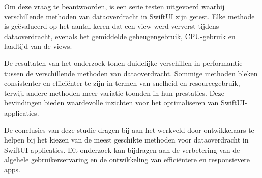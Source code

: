 Om deze vraag te beantwoorden, is een serie testen uitgevoerd waarbij verschillende methoden van dataoverdracht in SwiftUI zijn getest. Elke methode is geëvalueerd op het aantal keren dat een view werd ververst tijdens dataoverdracht, evenals het gemiddelde geheugengebruik, CPU-gebruik en laadtijd van de views.

De resultaten van het onderzoek tonen duidelijke verschillen in performantie tussen de verschillende methoden van dataoverdracht. Sommige methoden bleken consistenter en efficiënter te zijn in termen van snelheid en resourcegebruik, terwijl andere methoden meer variatie toonden in hun prestaties. Deze bevindingen bieden waardevolle inzichten voor het optimaliseren van SwiftUI-applicaties.

De conclusies van deze studie dragen bij aan het werkveld door ontwikkelaars te helpen bij het kiezen van de meest geschikte methoden voor dataoverdracht in SwiftUI-applicaties. Dit onderzoek kan bijdragen aan de verbetering van de algehele gebruikerservaring en de ontwikkeling van efficiëntere en responsievere apps.
